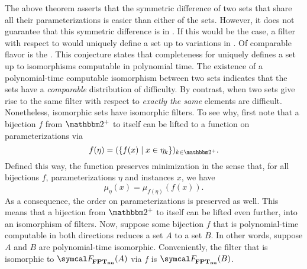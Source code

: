 The above theorem asserts that the symmetric difference of two sets that share all their parameterizations is easier than either of the sets.
However, it does not guarantee that this symmetric difference is in .
If this would be the case, a filter with respect to  would uniquely define a set up to variations in .
Of comparable flavor is the  \parencite{berman1977isomorphisms,young1983some}.
This conjecture states that completeness for  uniquely defines a set up to isomorphisms computable in polynomial time.
The existence of a polynomial-time computable isomorphism between two sets indicates that the sets have a \emph{comparable} distribution of difficulty.
By contrast, when two sets give rise to the same filter with respect to  \emph{exactly the same} elements are difficult.
Nonetheless, isomorphic sets have isomorphic filters.
To see why, first note that a bijection $f$ from $\binary^+$ to itself can be lifted to a function on parameterizations via
\begin{equation*}
  f(\eta) = (\{f(x) \st x \in \eta_k\})_{k \in \binary^+}.
\end{equation*}
Defined this way, the function preserves minimization in the sense that, for all bijections $f$, parameterizations $\eta$ and instances $x$, we have
\begin{equation*}
  \mu_\eta(x) = \mu_{f(\eta)}(f(x)).
\end{equation*}
As a consequence, the order on parameterizations is preserved as well.
This means that a bijection from $\binary^+$ to itself can be lifted even further, into an isomorphism of filters.
Now, suppose some bijection $f$ that is polynomial-time computable in both directions reduces a set $A$ to a set $B$.
In other words, suppose $A$ and $B$ are polynomial-time isomorphic.
Conveniently, the filter that is isomorphic to $\calF_\clnu{FPT}(A)$ via $f$ is $\calF_\clnu{FPT}(B)$.

